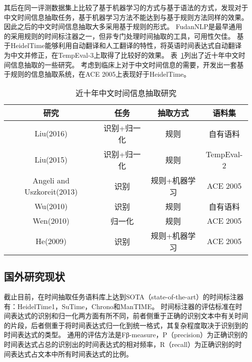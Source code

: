 其后\citet{wu2005normalizing}在同一评测数据集上比较了基于机器学习的方式与基于语法的方式，发现对于中文时间信息抽取任务，基于机器学习方法不能达到与基于规则方法同样的效果。因此之后的中文时间信息抽取大多采用基于规则的形式。
FudanNLP\cite{qiu2013fudannlp}是最早通用的采用规则的时间标注器之一，但非专门处理时间抽取的工具，可用性欠佳。
\citet{li2014chinese}基于HeidelTime能够利用自动翻译和人工翻译的特性，将英语时间表达式自动翻译为中文并修正，在TempEval-3上取得了比较好的效果。
表~\ref{tab:research}列出了近十年中文时间信息抽取的一些研究。
\citet{liu2016cmedtex}考虑到临床上对于中文时间信息的需要，开发出一套基于规则的信息抽取系统，在ACE 2005上表现好于HeidelTime。

\begin{table}[h]
    \centering
    \caption{近十年中文时间信息抽取研究}
    \begin{tabular}{*{4}{c}}
        \toprule
        研究      & 任务        & 抽取方式 & 语料集   \\
        \midrule
        Liu(2016) & 识别+归一化 & 规则     & 自有语料 \\
        Liu(2015) & 识别+归一化 & 规则 & TempEval-2 \\
        Angeli and Uszkoreit(2013) & 识别 & 规则+机器学习 & ACE 2005 \\
        Wu(2010) & 识别 & 规则 & 自有语料 \\
        Wen(2010) & 归一化 & 规则 & ACE 2005\\
        He(2009) & 识别 & 规则+机器学习 & ACE 2005\\
        \bottomrule
    \end{tabular}
    \label{tab:research}
\end{table}


\subsection{国外研究现状}


截止目前，在时间抽取任务语料库上达到SOTA（state-of-the-art）的时间标注器有：HeidelTime1\cite{strotgen2010heideltime}，SuTime\cite{chang2012sutime}，Chrono\cite{olex2018chrono}和ManTIME\cite{filannino2013mantime}。
时间标注器的评估标准在时间表达式的识别和归一化两方面有所不同，前者侧重于正确的识别文本中有关时间的片段，后者侧重于将时间表达式归一化到统一格式，其复杂程度取决于识别到的时间表达式的类型。
通用的评估方法是Fβ-measure，P（precision）为正确识别的时间表达式占总的识别出的时间表达式的相对频率，R（recall）为正确识别的时间表达式占文本中所有时间表达式的比例。

